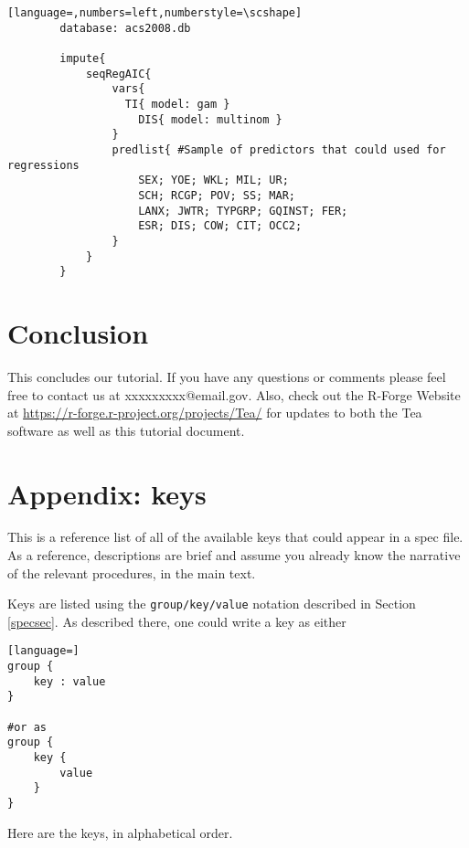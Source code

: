 \documentclass{article}
\begin{document}
        \begin{lstlisting}[language=,numbers=left,numberstyle=\scshape]
        database: acs2008.db

        impute{
            seqRegAIC{
                vars{
                  TI{ model: gam }
                    DIS{ model: multinom }
                }
                predlist{ #Sample of predictors that could used for regressions
                    SEX; YOE; WKL; MIL; UR;
                    SCH; RCGP; POV; SS; MAR;
                    LANX; JWTR; TYPGRP; GQINST; FER;
                    ESR; DIS; COW; CIT; OCC2;
                }
            }
        }

        \end{lstlisting}


\section{Conclusion}
This concludes our tutorial. If you have any questions or comments please feel free to contact 
us at xxxxxxxxx@email.gov. Also, check out the R-Forge Website at 
\url{https://r-forge.r-project.org/projects/Tea/} for updates to both the Tea software as well 
as this tutorial document.

\section*{Appendix: keys}

This is a reference list of all of the available keys that could appear in a spec file.
As a reference, descriptions are brief and assume you already know the narrative of the
relevant procedures, in the main text.

Keys are listed using the {\tt group/key/value} notation described in Section \ref{specsec}. As described there, one could write a key as either
\begin{lstlisting}[language=]
group {
    key : value
}

#or as
group {
    key {
        value
    }
}
\end{lstlisting}

Here are the keys, in alphabetical order.



%
%
%
\end{document}
